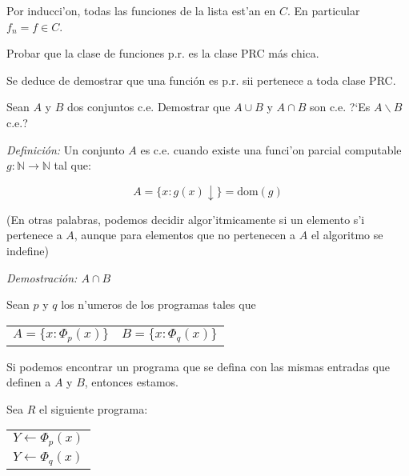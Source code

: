\begin{questions}
\begin{solution}
\begin{itemize}
    Por inducci'on, todas las funciones de la lista est'an en $C$. En particular $f_n = f \in C$. 
  \end{itemize}

\end{solution}

\question Probar que la clase de funciones p.r. es la clase PRC m\'as chica. 

\begin{solution}
 Se deduce de demostrar que una funci\'on es p.r. sii pertenece a toda clase PRC. 
\end{solution}

\question Sean $A$ y $B$ dos conjuntos c.e. Demostrar que $A \cup B$ y $A \cap B$ son c.e. ?`Es $A\backslash B$ c.e.?
\begin{solution}
  
  {\it Definici\'on:} Un conjunto $A$ es c.e. cuando existe una funci'on parcial computable $g: \mathbb{N} \rightarrow \mathbb{N}$ tal que: 

  \begin{equation*}
  A = \{ x : g(x) \downarrow \} = \text{dom}(g)
  \end{equation*}

  (En otras palabras, podemos decidir algor'itmicamente si un elemento s'i pertenece a $A$, aunque para elementos que no pertenecen a $A$ el algoritmo se indefine)

  {\it Demostraci\'on: $A \cap B$}

  Sean $p$ y $q$ los n'umeros de los programas tales que

  \begin{center}
  \begin{tabular}{ l r }
  \(\displaystyle A = \{ x : \Phi_p(x) \} \) & \(\displaystyle B = \{ x : \Phi_q(x) \} \) \\
  \end{tabular}
  \end{center}

  Si podemos encontrar un programa que se defina con las mismas entradas que definen a $A$ y $B$, entonces estamos. 

  Sea $R$ el siguiente programa: 

  \vspace{0.5cm}
  \begin{tabular}{l}
  $Y \leftarrow \Phi_p(x)$ \\ 
  $Y \leftarrow \Phi_q(x)$
  \end{tabular}
  \vspace{0.5cm}


\end{solution}
\end{questions}
